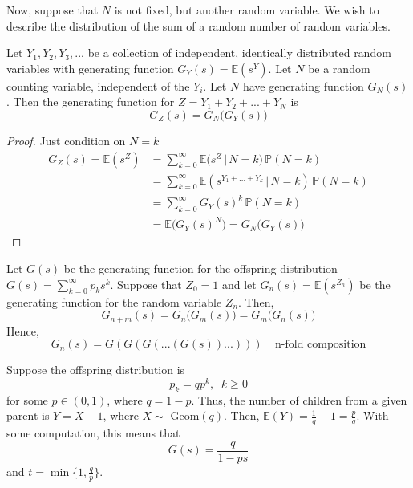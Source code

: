\documentclass{article}
\begin{document}
      Now, suppose that $N$ is not fixed, but another random variable. We wish to describe the distribution of the sum of a random number of random variables. 

      \begin{lemma}
        Let $Y_1, Y_2, Y_3, ...$ be a collection of independent, identically distributed random variables with generating function $G_Y (s) = \mathbb{E}(s^Y)$. Let $N$ be a random counting variable, independent of the $Y_i$. Let $N$ have generating function $G_N (s)$. Then the generating function for $Z = Y_1 + Y_2 + ... + Y_N$ is 
        \begin{equation}
          G_Z (s) = G_N \big( G_Y (s) \big)
        \end{equation}
      \end{lemma}
      \begin{proof}
        Just condition on $N = k$ 
        \begin{align*}
          G_Z (s) = \mathbb{E}(s^Z) & = \sum_{k=0}^\infty \mathbb{E}\big( s^Z \,|\, N=k\big) \, \mathbb{P}(N=k) \\
          & = \sum_{k=0}^\infty \mathbb{E}(s^{Y_1 + ... + Y_k} \,|\,N=k) \, \mathbb{P}(N=k) \\
          & = \sum_{k=0}^\infty G_Y (s)^k \, \mathbb{P}(N=k) \\
          & = \mathbb{E}\big( G_Y (s)^N \big) = G_N \big( G_Y (s) \big)
        \end{align*}
      \end{proof}

      \begin{theorem}
        Let $G(s)$ be the generating function for the offspring distribution $G(s) = \sum_{k=0}^\infty p_k s^k$. Suppose that $Z_0 = 1$ and let $G_n (s) = \mathbb{E}(s^{Z_n})$ be the generating function for the random variable $Z_n$. Then, 
        \begin{equation}
          G_{n+m} (s) = G_n \big(G_m (s)\big) = G_m \big( G_n (s) \big)
        \end{equation}
        Hence, 
        \begin{equation}
          G_n (s) = G(G(G(...(G(s))...))) \;\;\;\; \text{n-fold composition}
        \end{equation}
      \end{theorem}

      \begin{example}
        Suppose the offspring distribution is
        \begin{equation}
          p_k = q p^k, \;\; k \geq 0
        \end{equation}
        for some $p \in (0, 1)$, where $q = 1-p$. Thus, the number of children from a given parent is $Y = X - 1$, where $X \sim$ Geom$(q)$. Then, $\mathbb{E}(Y) = \frac{1}{q} - 1 = \frac{p}{q}$. With some computation, this means that
        \begin{equation}
          G(s) = \frac{q}{1- p s}
        \end{equation}
        and $t = \min \{1, \frac{q}{p}\}$. 
      \end{example}
\end{document}
